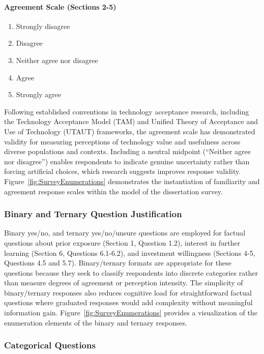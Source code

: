 \paragraph{Agreement Scale (Sections 2-5)}
\begin{enumerate}
  \item Strongly disagree
  \item Disagree
  \item Neither agree nor disagree
  \item Agree
  \item Strongly agree
\end{enumerate}

Following established conventions in technology acceptance research, including the Technology Acceptance Model (TAM) and Unified Theory of Acceptance and Use of Technology (UTAUT) frameworks, the agreement scale has demonstrated validity for measuring perceptions of technology value and usefulness across diverse populations and contexts. Including a neutral midpoint (``Neither agree nor disagree'') enables respondents to indicate genuine uncertainty rather than forcing artificial choices, which research suggests improves response validity. Figure~\ref{fig:SurveyEnumerations} demonstrates the instantiation of familiarity and agreement response scales within the model of the dissertation survey.

\subsubsection{Binary and Ternary Question Justification}

Binary yes/no, and ternary yes/no/unsure questions are employed for factual questions about prior exposure (Section 1, Question 1.2), interest in further learning (Section 6, Questions 6.1-6.2), and investment willingness (Sections 4-5, Questions 4.5 and 5.7). Binary/ternary formats are appropriate for these questions because they seek to classify respondents into discrete categories rather than measure degrees of agreement or perception intensity. The simplicity of binary/ternary responses also reduces cognitive load for straightforward factual questions where graduated responses would add complexity without meaningful information gain. Figure~\ref{fig:SurveyEnumerations} provides a visualization of the enumeration elements of the binary and ternary responses.

\subsubsection{Categorical Questions}

